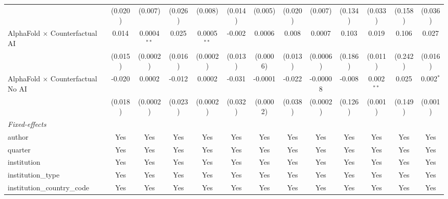 \begin{tabular}{lcccccccccccc}
                                            & (0.020)       & (0.007)        & (0.026)       & (0.008)       & (0.014)       & (0.005)        & (0.020)       & (0.007)        & (0.134) & (0.033)       & (0.158) & (0.036)\\   
   AlphaFold $\times$ Counterfactual AI     & 0.014         & 0.0004$^{**}$  & 0.025         & 0.0005$^{**}$ & -0.002        & 0.0006         & 0.008         & 0.0007         & 0.103   & 0.019         & 0.106   & 0.027\\   
                                            & (0.015)       & (0.0002)       & (0.016)       & (0.0002)      & (0.013)       & (0.0006)       & (0.013)       & (0.0006)       & (0.186) & (0.011)       & (0.242) & (0.016)\\   
   AlphaFold $\times$ Counterfactual No AI  & -0.020        & 0.0002         & -0.012        & 0.0002        & -0.031        & -0.0001        & -0.022        & -0.00008       & -0.008  & 0.002$^{**}$  & 0.025   & 0.002$^{*}$\\   
                                            & (0.018)       & (0.0002)       & (0.023)       & (0.0002)      & (0.032)       & (0.0002)       & (0.038)       & (0.0002)       & (0.126) & (0.001)       & (0.149) & (0.001)\\   
   \midrule
   \emph{Fixed-effects}\\
   author                                   & Yes           & Yes            & Yes           & Yes           & Yes           & Yes            & Yes           & Yes            & Yes     & Yes           & Yes     & Yes\\  
   quarter                                  & Yes           & Yes            & Yes           & Yes           & Yes           & Yes            & Yes           & Yes            & Yes     & Yes           & Yes     & Yes\\  
   institution                              & Yes           & Yes            & Yes           & Yes           & Yes           & Yes            & Yes           & Yes            & Yes     & Yes           & Yes     & Yes\\  
   institution\_type                        & Yes           & Yes            & Yes           & Yes           & Yes           & Yes            & Yes           & Yes            & Yes     & Yes           & Yes     & Yes\\  
   institution\_country\_code               & Yes           & Yes            & Yes           & Yes           & Yes           & Yes            & Yes           & Yes            & Yes     & Yes           & Yes     & Yes\\  

\end{tabular}
